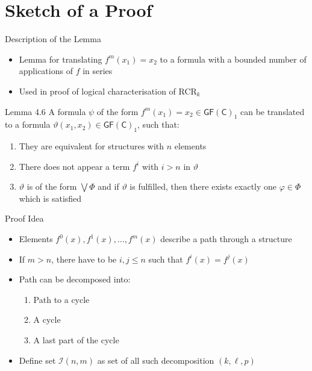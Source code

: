\documentclass[aspectratio=169]{beamer}
\newcommand{\GFC}{\mathsf{GF}(\mathsf{C})}
\renewcommand{\theta}{\vartheta}
\renewcommand{\phi}{\varphi}
\begin{document}
	\section{Sketch of a Proof}
	
	\begin{frame}{Description of the Lemma}
		\begin{itemize}
			\item Lemma for translating $f^m(x_1)=x_2$ to a formula with a bounded number of applications of $f$ in series
			\item Used in proof of logical characterisation of RCR$_k$
		\end{itemize}
		\begin{block}{Lemma 4.6}
			A formula $\psi$ of the form $f^m(x_1)=x_2\in \GFC_1$ can be translated to a formula $\theta(x_1,x_2)\in\GFC_1$, such that:
			\begin{enumerate}
				\item They are equivalent for structures with $n$ elements
				\item There does not appear a term $f^i$ with $i>n$ in $\theta$
				\item $\theta$ is of the form $\bigvee \Phi$ and if $\theta$ is fulfilled, then there exists exactly one $\phi\in\Phi$ which is satisfied
			\end{enumerate}
		\end{block}
	\end{frame}
	
	\begin{frame}{Proof Idea}
		\begin{itemize}
			\item Elements $f^0(x),f^1(x),\dots,f^m(x)$ describe a path through a structure
			\item If $m>n$, there have to be $i,j\leq n$ such that $f^i(x)=f^j(x)$
			\item Path can be decomposed into:
			\begin{enumerate}
				\item Path to a cycle
				\item A cycle
				\item A last part of the cycle
			\end{enumerate}
			\item Define set $\mathcal I(n,m)$ as set of all such decomposition $(k,\ell,p)$
		\end{itemize}
		\centering
	\end{frame}
	
\end{document}
